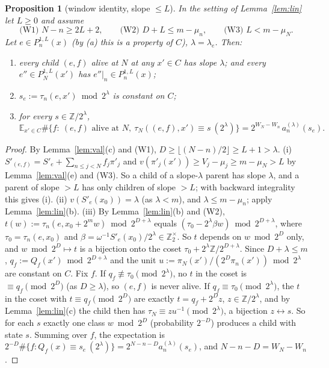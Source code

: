 \documentclass[11pt]{amsart}
\newtheorem{proposition}[theorem]{Proposition}
\theoremstyle{definition}
\newcommand{\Z}{\mathbb Z}
\newcommand{\E}{\mathbb E}
\begin{document}
\begin{proposition}[window identity, slope $\le L$]\label{prop:window1}
In the setting of Lemma~\ref{lem:lin} let $L\ge0$ and assume
\[ \text{(W1) } N-n\ge2L+2,\qquad \text{(W2) } D+L\le m-\mu_n,\qquad \text{(W3) } L<m-\mu_N. \]
Let $e\in P^{1,L}_n(x)$ (by (a) this is a property of $C$), $\lambda=\lambda_e$. Then:
\begin{enumerate}
\item[(i)] every child $(e,f)$ alive at $N$ at any $x'\in C$ has slope $\lambda$; and every $e''\in P^{1,L}_N(x')$ has
$e''|_n\in P^{1,L}_n(x)$;
\item[(ii)] $s_e:=\tau_n(e,x')\bmod2^\lambda$ is constant on $C$;
\item[(iii)] for every $s\in\Z/2^\lambda$,
\[\E_{x'\in C}\#\{f:\ (e,f)\text{ alive at }N,\ \tau_N((e,f),x')\equiv s\ (2^\lambda)\}=2^{W_N-W_n}\,a^{(\lambda)}_n(s_e).\]
\end{enumerate}
\end{proposition}
\begin{proof}
By Lemma~\ref{lem:val}(c) and (W1), $D\ge\lfloor (N-n)/2\rfloor\ge L+1>\lambda$.
(i) $S'_{(e,f)}=S'_e+\sum_{n\le j<N}f_j\pi'_j$ and $v(\pi'_j(x'))\ge V_j-\mu_j\ge m-\mu_N>L$ by Lemma~\ref{lem:val}(e) and (W3).
So a child of a slope-$\lambda$ parent has slope $\lambda$, and a parent of slope $>L$ has only children of slope $>L$;
with backward integrality this gives (i).
(ii) $v(S'_e(x_0))=\lambda$ (as $\lambda<m$), and $\lambda\le m-\mu_n$; apply Lemma~\ref{lem:lin}(b).
(iii) By Lemma~\ref{lem:lin}(b) and (W2), $t(w):=\tau_n(e,x_0+2^mw)\bmod 2^{D+\lambda}$ equals
$(\tau_0-2^\lambda\beta w)\bmod2^{D+\lambda}$, where $\tau_0=\tau_n(e,x_0)$ and $\beta=\omega^{-1}S'_e(x_0)/2^\lambda\in\Z_2^\times$.
So $t$ depends on $w\bmod2^D$ only, and $w\bmod 2^D\mapsto t$ is a bijection onto the coset $\tau_0+2^\lambda\Z/2^{D+\lambda}$.
Since $D+\lambda\le m$, $q_f:=Q_f(x')\bmod2^{D+\lambda}$ and the unit $u:=\pi_N(x')/(2^D\pi_n(x'))\bmod 2^\lambda$ are constant on $C$.
Fix $f$. If $q_f\not\equiv\tau_0\pmod{2^\lambda}$, no $t$ in the coset is $\equiv q_f\pmod{2^D}$ (as $D\ge\lambda$), so $(e,f)$ is never alive.
If $q_f\equiv\tau_0\pmod{2^\lambda}$, the $t$ in the coset with $t\equiv q_f\pmod{2^D}$ are exactly $t=q_f+2^Dz$, $z\in\Z/2^\lambda$, and
by Lemma~\ref{lem:lin}(c) the child then has $\tau_N\equiv zu^{-1}\pmod{2^\lambda}$, a bijection $z\leftrightarrow s$. So for each $s$
exactly one class $w\bmod2^D$ (probability $2^{-D}$) produces a child with state $s$. Summing over $f$, the expectation is
$2^{-D}\#\{f: Q_f(x)\equiv s_e\ (2^\lambda)\}=2^{N-n-D}a^{(\lambda)}_n(s_e)$, and $N-n-D=W_N-W_n$.
\end{proof}
\end{document}
